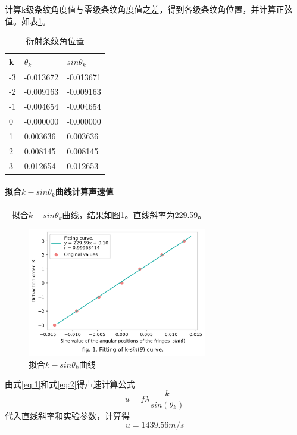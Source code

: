 \documentclass[12pt,a4paper,UTF8]{ctexart}
\begin{document}
		计算k级条纹角度值与零级条纹角度值之差，得到各级条纹角位置，并计算正弦值。如表\ref{tab:2}。
		\begin{table}[htbp]
			\centering
			\begin{tabular}{|l|l|l|}
			\hline
				k & $\theta_k$ & $sin\theta_k$ \\ \hline
				-3 & -0.013672 & -0.013671 \\ \hline
				-2 & -0.009163 & -0.009163 \\ \hline
				-1 & -0.004654 & -0.004654 \\ \hline
				0 & -0.000000 & -0.000000 \\ \hline
				1 & 0.003636 & 0.003636 \\ \hline
				2 & 0.008145 & 0.008145 \\ \hline
				3 & 0.012654 & 0.012653 \\ \hline
			\end{tabular}
			\caption{衍射条纹角位置}
			\label{tab:2}
		\end{table}
		
		\paragraph{拟合$k-sin\theta_k$曲线计算声速值}~
		\newline
		\indent
		拟合$k-sin\theta_k$曲线，结果如图\ref{fig:1}。直线斜率为229.59。
		\begin{figure}[htbp]
			\centering
			\includegraphics[width=0.7\textwidth]{attachments/fig.1.png}
			\caption{拟合$k-sin\theta_k$曲线}
			\label{fig:1}
		\end{figure}
		
		由式\ref{eq:1}和式\ref{eq:2}得声速计算公式
		\begin{equation}\label{eq:5}
			u = f\lambda\frac{k}{sin(\theta_k)}
		\end{equation}
		代入直线斜率和实验参数，计算得
		$$
		u = 1439.56 m/s
		$$
\end{document}
